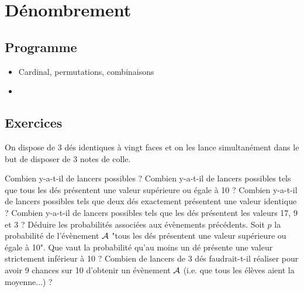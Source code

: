  \chapter{Dénombrement}
 
\section{Programme}
	\begin{itemize}
 	\item Cardinal, permutations, combinaisons
 	\item 
 \end{itemize}



\section{Exercices}




\begin{exercise}[subtitle= Dé à 20 faces]
	On dispose de 3 dés identiques à vingt faces et on les lance simultanément dans le but de disposer de 3 notes de colle. 
	\begin{tasks}
		\task Combien y-a-t-il de lancers possibles ?
		\task Combien y-a-t-il de lancers possibles tels que tous les dés présentent une valeur supérieure ou égale à 10 ?
		\task Combien y-a-t-il de lancers possibles tels que deux dés exactement présentent une valeur identique ? 
		\task Combien y-a-t-il de lancers possibles tels que les dés présentent  les valeurs 17, 9 et 3 ?
		\task Déduire les probabilités associées aux évènements précédents.  
		\task Soit $p$ la probabilité de l'évènement $\mathcal{A}$ "tous les dés présentent une valeur supérieure ou égale à 10". Que vaut la probabilité qu'au moins un dé présente une valeur strictement inférieur à 10 ?   
		\task Combien de lancers de 3 dés faudrait-t-il réaliser pour avoir 9 chances sur 10 d'obtenir un évènement $\mathcal{A}$ (i.e. que tous les élèves aient la moyenne$\dots$) ? 
	\end{tasks}
\end{exercise}


